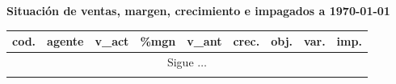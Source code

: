 \documentclass[a4paper]{article}
\begin{document}
\begin{center}
\textbf{Situación de ventas, margen, crecimiento e impagados a {\today}}
\small
\begin{longtable}{llrrrrrrr}
\toprule
\textbf{cod.}&\textbf{agente}&\textbf{v\_act}&\textbf{\%mgn}&\textbf{v\_ant}&\textbf{crec.}&\textbf{obj.}&\textbf{var.}&\textbf{imp.}\\
\toprule
\endhead
\multicolumn{9}{c}{Sigue $\ldots$}\\
\endfoot
\endlastfoot

\bottomrule
\end{longtable}
\end{center}
\end{document}
